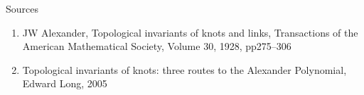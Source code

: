 \documentclass[10pt]{beamer}
\begin{document}
\begin{frame}[fragile]{Sources}
\begin{enumerate}
\item JW Alexander, Topological invariants of knots and links, Transactions of the American Mathematical Society, Volume 30, 1928, pp275–306 
\item Topological invariants of knots: three routes to the Alexander Polynomial, Edward Long, 2005
\end{enumerate}
\end{frame}

\end{document}
